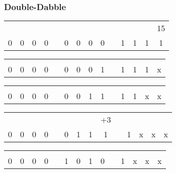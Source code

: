 \documentclass{beamer}
\begin{document}
	\begin{frame}
		\frametitle{Double-Dabble}

		{\begin{center}
			\def\arraystretch{1.5}
			\begin{tabular}{|c|c|c|c|c|c|c|c|c|c|c|c|c|c|}
				\multicolumn{13}{c}{}&\multicolumn{1}{c}{15}\\
				\cline{1-4} \cline{6-9} \cline{11-14}
				0&0&0&0&&0&0&0&0&&1&1&1&1\\
				\cline{1-4} \cline{6-9} \cline{11-14}
			\end{tabular}
		\end{center}}
		\only<2>
		{\begin{center}
			\def\arraystretch{1.5}
			\begin{tabular}{|c|c|c|c|c|c|c|c|c|c|c|c|c|c|}
				\multicolumn{14}{c}{}\\
				\cline{1-4} \cline{6-9} \cline{11-14}
				0&0&0&0&&0&0&0&1&&1&1&1&x\\
				\cline{1-4} \cline{6-9} \cline{11-14}
			\end{tabular}
		\end{center}}
		\only<3>
		{\begin{center}
			\def\arraystretch{1.5}
			\begin{tabular}{|c|c|c|c|c|c|c|c|c|c|c|c|c|c|}
				\multicolumn{14}{c}{}\\
				\cline{1-4} \cline{6-9} \cline{11-14}
				0&0&0&0&&0&0&1&1&&1&1&x&x\\
				\cline{1-4} \cline{6-9} \cline{11-14}
			\end{tabular}
		\end{center}}
		\only<4>
		{\begin{center}
			\def\arraystretch{1.5}
			\begin{tabular}{|c|c|c|c|c|c|c|c|c|c|c|c|c|c|}
				\multicolumn{8}{c}{}&\multicolumn{1}{c}{+3}&\multicolumn{4}{c}{}\\
				\cline{1-4} \cline{6-9} \cline{11-14}
				0&0&0&0&&0&1&1&1&&1&x&x&x\\
				\cline{1-4} \cline{6-9} \cline{11-14}
			\end{tabular}
		\end{center}}
		\only<5>
		{\begin{center}
			\def\arraystretch{1.5}
			\begin{tabular}{|c|c|c|c|c|c|c|c|c|c|c|c|c|c|}
				\multicolumn{14}{c}{}\\
				\cline{1-4} \cline{6-9} \cline{11-14}
				0&0&0&0&&1&0&1&0&&1&x&x&x\\

\end{tabular}
\end{center}}
\end{frame}
\end{document}
